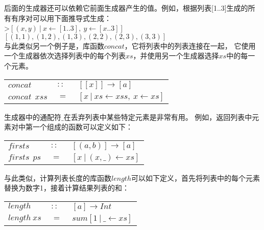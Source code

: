 后面的生成器还可以依赖它前面生成器产生的值。例如，根据列表[1..3]生成的所有有序对可以用下面推导式生成：\\

\noindent\hspace*{1cm}>$[(x,y)~|~x\leftarrow [1..3],~y\leftarrow [x..3]]$\\
\hspace*{1cm}$[(1,1),(1,2),(1,3),(2,2),(2,3),(3,3)]$\\

与此类似另一个例子是，库函数$concat$，它将列表中的列表连接在一起， 它使用一个生成器依次选择列表中的每个列表$xs$，并使用另一个生成器选择$xs$中的每一个元素。\\

\begin{tabular}[t]{lll}
  $concat$&$~::~$&$[[x]]\rightarrow [a]$\\
  $concat~~xss$&$~=~$&$[x~|~xs \leftarrow xss,~x\leftarrow xs]$
\end{tabular}




生成器中的通配符$\_$在丢弃列表中某些特定元素是非常有用。 例如，返回列表中元素对中第一个组成的函数可以定义如下：

\begin{tabular}[t]{lll}
  $firsts$&$~::~$&$[(a,b)] \rightarrow [a]$\\
  $firsts~~ps$&$~=~$&$[x~|~(x,\_ ) \leftarrow xs]$\\
\end{tabular}

\noindent 与此类似，计算列表长度的库函数$length$可以如下定义，首先将列表中的每个元素替换为数字1，接着计算结果列表的和：

\begin{tabular}[t]{lll}
$length$&$~::~$&$[a]\rightarrow Int$\\
$length~xs$&$~=~$&$sum[1~|~\_ \leftarrow xs]$\\  
\end{tabular}\\

